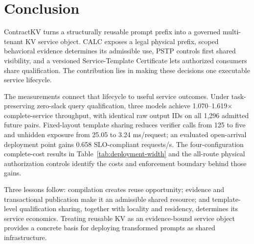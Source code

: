 \section{Conclusion}
\label{sec:conclusion}
ContractKV turns a structurally reusable prompt prefix into a governed multi-tenant KV service object. CALC exposes a legal physical prefix, scoped behavioral evidence determines its admissible use, PSTP controls first shared visibility, and a versioned Service-Template Certificate lets authorized consumers share qualification. The contribution lies in making these decisions one executable service lifecycle.

The measurements connect that lifecycle to useful service outcomes. Under task-preserving zero-slack query qualification, three models achieve 1.070--1.619$\times$ complete-service throughput, with identical raw output IDs on all 1,296 admitted future pairs. Fixed-layout template sharing reduces verifier calls from 125 to five and unhidden exposure from 25.05 to 3.24 ms/request; an evaluated open-arrival deployment point gains 0.658 SLO-compliant requests/s. The four-configuration complete-cost results in Table~\ref{tab:deployment-width} and the all-route physical authorization controls identify the costs and enforcement boundary behind those gains.

Three lessons follow: compilation creates reuse opportunity; evidence and transactional publication make it an admissible shared resource; and template-level qualification sharing, together with locality and residency, determines its service economics. Treating reusable KV as an evidence-bound service object provides a concrete basis for deploying transformed prompts as shared infrastructure.
